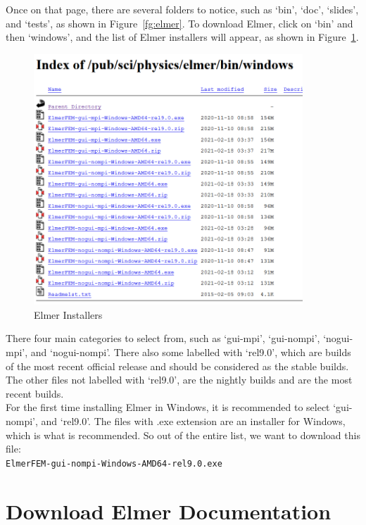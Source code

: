 Once on that page, there are several folders to notice, such as `bin', `doc', `slides', and `tests', as shown in Figure~\ref{fg:elmer}.  To download Elmer, click on `bin' and then `windows', and the list of Elmer installers will appear, as shown in Figure~\ref{fg:elmer-bin-win}.

\begin{figure}[H]
\centering
\includegraphics[width=0.9\textwidth]{elmer-bin-win}
\caption{Elmer Installers}\label{fg:elmer-bin-win}
\end{figure}

There four main categories to select from, such as `gui-mpi', `gui-nompi', `nogui-mpi', and `nogui-nompi'.  There also some labelled with `rel9.0', which are builds of the most recent official release and should be considered as the stable builds.  The other files not labelled with `rel9.0', are the nightly builds and are the most recent builds.\\

For the first time installing Elmer in Windows, it is recommended to select `gui-nompi', and `rel9.0'.  The files with .exe extension are an installer for Windows, which is what is recommended.  So out of the entire list, we want to download this file:\\

\texttt{ElmerFEM-gui-nompi-Windows-AMD64-rel9.0.exe}

\section{Download Elmer Documentation}

